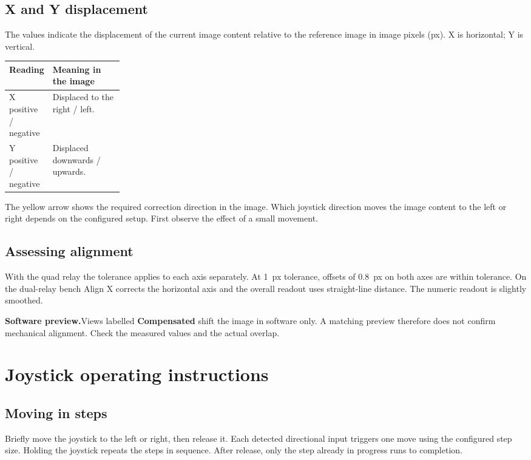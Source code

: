\documentclass[a4paper,11pt]{article}
\newcommand{\Note}[2]{\par\smallskip\textbf{#1}\enspace #2\par\smallskip}
\begin{document}
\subsection{X and Y displacement}

The values indicate the displacement of the current image content relative
to the reference image in image pixels (px). X is horizontal; Y is vertical.

\begin{tabularx}{\linewidth}{@{}L{0.22\linewidth}Y@{}}
\toprule
\textbf{Reading} & \textbf{Meaning in the image} \\
\midrule
X positive / negative & Displaced to the right / left. \\
Y positive / negative & Displaced downwards / upwards. \\
\bottomrule
\end{tabularx}

The yellow arrow shows the required correction direction in the image.
Which joystick direction moves the image content to the left or right
depends on the configured setup. First observe the effect of a small movement.

\subsection{Assessing alignment}

With the quad relay the tolerance applies to each axis separately. At 1~px tolerance, offsets of 0.8~px on both axes are within tolerance. On the dual-relay bench Align X corrects the horizontal axis and the overall readout uses straight-line distance. The numeric readout is slightly smoothed.

\Note{Software preview.}{Views labelled \textbf{Compensated} shift the image
in software only. A matching preview therefore does not confirm mechanical
alignment. Check the measured values and the actual overlap.}

\newpage
\section{Joystick operating instructions}

\subsection{Moving in steps}

Briefly move the joystick to the left or right, then release it. Each detected
directional input triggers one move using the configured step size. Holding
the joystick repeats the steps in sequence. After release, only the step
already in progress runs to completion.
\end{document}
